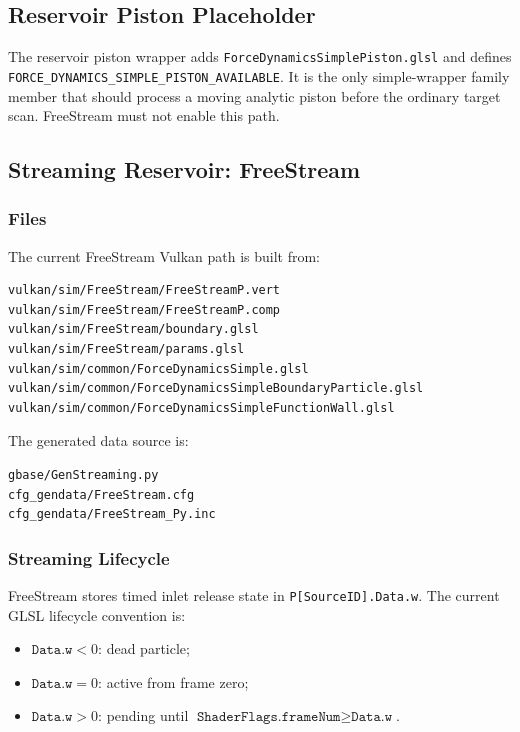 \subsection{Reservoir Piston Placeholder}

The reservoir piston wrapper adds \texttt{ForceDynamicsSimplePiston.glsl} and
defines \texttt{FORCE\_DYNAMICS\_SIMPLE\_PISTON\_AVAILABLE}.  It is the only
simple-wrapper family member that should process a moving analytic piston
before the ordinary target scan.  FreeStream must not enable this path.

\subsection{Streaming Reservoir: FreeStream}

\subsubsection{Files}

The current FreeStream Vulkan path is built from:
\begin{verbatim}
vulkan/sim/FreeStream/FreeStreamP.vert
vulkan/sim/FreeStream/FreeStreamP.comp
vulkan/sim/FreeStream/boundary.glsl
vulkan/sim/FreeStream/params.glsl
vulkan/sim/common/ForceDynamicsSimple.glsl
vulkan/sim/common/ForceDynamicsSimpleBoundaryParticle.glsl
vulkan/sim/common/ForceDynamicsSimpleFunctionWall.glsl
\end{verbatim}

The generated data source is:
\begin{verbatim}
gbase/GenStreaming.py
cfg_gendata/FreeStream.cfg
cfg_gendata/FreeStream_Py.inc
\end{verbatim}

\subsubsection{Streaming Lifecycle}

FreeStream stores timed inlet release state in \texttt{P[SourceID].Data.w}.
The current GLSL lifecycle convention is:
\begin{itemize}
    \item \(\texttt{Data.w}<0\): dead particle;
    \item \(\texttt{Data.w}=0\): active from frame zero;
    \item \(\texttt{Data.w}>0\): pending until
          \(\texttt{ShaderFlags.frameNum} \ge \texttt{Data.w}\).
\end{itemize}

